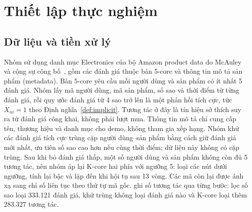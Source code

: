 \section{Thiết lập thực nghiệm}
\label{sec:experiments}

\subsection{Dữ liệu và tiền xử lý}
\label{sec:data}

Nhóm sử dụng danh mục Electronics của bộ Amazon product data do McAuley và cộng sự công bố~\cite{mcauley2015image,he2016ups}, gồm các đánh giá thuộc bản 5-core và thông tin mô tả sản phẩm (metadata). Bản 5-core yêu cầu mỗi người dùng và sản phẩm có ít nhất 5 đánh giá. Nhóm lấy mã người dùng, mã sản phẩm, số sao và thời điểm từ từng đánh giá, rồi quy ước đánh giá từ 4 sao trở lên là một phản hồi tích cực, tức $X_{ui}=1$ theo Định nghĩa~\ref{def:implicit}. Tương tác ở đây là tín hiệu sở thích suy ra từ đánh giá công khai, không phải lượt mua. Thông tin mô tả chỉ cung cấp tên, thương hiệu và danh mục cho demo, không tham gia xếp hạng.
Nhóm khử các đánh giá tích cực trùng cặp người dùng--sản phẩm bằng cách giữ đánh giá mới nhất, ưu tiên số sao cao hơn nếu cùng thời điểm; dữ liệu này không có cặp trùng. Sau khi bỏ đánh giá thấp, một số người dùng và sản phẩm không còn đủ 5 tương tác, nên nhóm áp lại K-core hai phía với ngưỡng 5: loại các nút dưới ngưỡng, tính lại bậc và lặp đến khi hội tụ sau 13 vòng. Các mã còn lại được ánh xạ sang chỉ số liên tục theo thứ tự mã gốc.  ghi số tương tác qua từng bước: lọc số sao loại 333.121 đánh giá, khử trùng không loại đánh giá nào và K-core loại thêm 283.327 tương tác.

